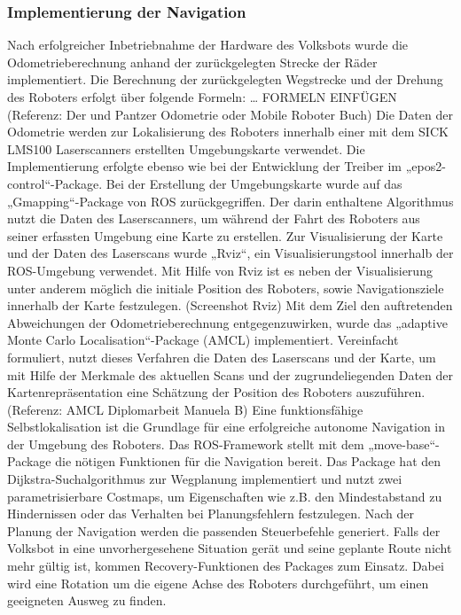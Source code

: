 \subsubsection{Implementierung der Navigation}
Nach erfolgreicher Inbetriebnahme der Hardware des Volksbots wurde die Odometrieberechnung anhand der zurückgelegten Strecke der Räder implementiert. Die Berechnung der zurückgelegten Wegstrecke und der Drehung des Roboters erfolgt über folgende Formeln: … FORMELN EINFÜGEN (Referenz: Der und Pantzer Odometrie oder Mobile Roboter Buch)
Die Daten der Odometrie werden zur Lokalisierung des Roboters innerhalb einer mit dem SICK LMS100 Laserscanners erstellten Umgebungskarte verwendet. Die Implementierung erfolgte ebenso wie bei der Entwicklung der Treiber im „epos2-control“-Package. Bei der Erstellung der Umgebungskarte wurde auf das „Gmapping“-Package von ROS zurückgegriffen. Der darin enthaltene Algorithmus nutzt die Daten des Laserscanners, um während der Fahrt des Roboters aus seiner erfassten Umgebung eine Karte zu erstellen. Zur Visualisierung der Karte und der Daten des Laserscans wurde „Rviz“, ein Visualisierungstool innerhalb der ROS-Umgebung verwendet. Mit Hilfe von Rviz ist es neben der Visualisierung unter anderem möglich die initiale Position des Roboters, sowie Navigationsziele innerhalb der Karte festzulegen. (Screenshot Rviz) Mit dem Ziel den auftretenden Abweichungen der Odometrieberechnung entgegenzuwirken, wurde das „adaptive Monte Carlo Localisation“-Package (AMCL) implementiert. Vereinfacht formuliert, nutzt dieses Verfahren die Daten des Laserscans und der Karte, um mit Hilfe der Merkmale des aktuellen Scans und der zugrundeliegenden Daten der Kartenrepräsentation eine Schätzung der Position des Roboters auszuführen. (Referenz: AMCL Diplomarbeit Manuela B)
Eine funktionsfähige Selbstlokalisation ist die Grundlage für eine erfolgreiche autonome Navigation in der Umgebung des Roboters. Das ROS-Framework stellt mit dem „move-base“-Package die nötigen Funktionen für die Navigation bereit. Das Package hat den Dijkstra-Suchalgorithmus zur Wegplanung implementiert und nutzt zwei parametrisierbare Costmaps, um Eigenschaften wie z.B. den Mindestabstand zu Hindernissen oder das Verhalten bei Planungsfehlern festzulegen. Nach der Planung der Navigation werden die passenden Steuerbefehle generiert. Falls der Volksbot in eine unvorhergesehene Situation gerät und seine geplante Route nicht mehr gültig ist, kommen Recovery-Funktionen des Packages zum Einsatz. Dabei wird eine Rotation um die eigene Achse des Roboters durchgeführt, um einen geeigneten Ausweg zu finden. 

